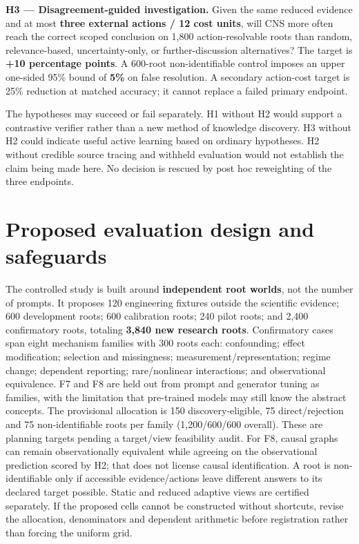 \documentclass[11pt,a4paper]{article}
\begin{document}
\textbf{H3 --- Disagreement-guided investigation.} Given the same
reduced evidence and at most \textbf{three external actions / 12 cost
units}, will CNS more often reach the correct scoped conclusion on 1,800
action-resolvable roots than random, relevance-based, uncertainty-only,
or further-discussion alternatives? The target is \textbf{+10 percentage
points}. A 600-root non-identifiable control imposes an upper one-sided
95\% bound of \textbf{5\%} on false resolution. A secondary action-cost
target is 25\% reduction at matched accuracy; it cannot replace a failed
primary endpoint.

The hypotheses may succeed or fail separately. H1 without H2 would
support a contrastive verifier rather than a new method of knowledge
discovery. H3 without H2 could indicate useful active learning based on
ordinary hypotheses. H2 without credible source tracing and withheld
evaluation would not establish the claim being made here. No decision is
rescued by post hoc reweighting of the three endpoints.

\section{Proposed evaluation design and
safeguards}\label{proposed-evaluation-design-and-safeguards}

The controlled study is built around \textbf{independent root worlds},
not the number of prompts. It proposes 120 engineering fixtures outside
the scientific evidence; 600 development roots; 600 calibration roots;
240 pilot roots; and 2,400 confirmatory roots, totaling \textbf{3,840
new research roots}. Confirmatory cases span eight mechanism families
with 300 roots each: confounding; effect modification; selection and
missingness; measurement/representation; regime change; dependent
reporting; rare/nonlinear interactions; and observational equivalence.
F7 and F8 are held out from prompt and generator tuning as families,
with the limitation that pre-trained models may still know the abstract
concepts. The provisional allocation is 150 discovery-eligible, 75
direct/rejection and 75 non-identifiable roots per family (1,200/600/600
overall). These are planning targets pending a target/view feasibility
audit. For F8, causal graphs can remain observationally equivalent while
agreeing on the observational prediction scored by H2; that does not
license causal identification. A root is non-identifiable only if
accessible evidence/actions leave different answers to its declared
target possible. Static and reduced adaptive views are certified
separately. If the proposed cells cannot be constructed without
shortcuts, revise the allocation, denominators and dependent arithmetic
before registration rather than forcing the uniform grid.
\end{document}
